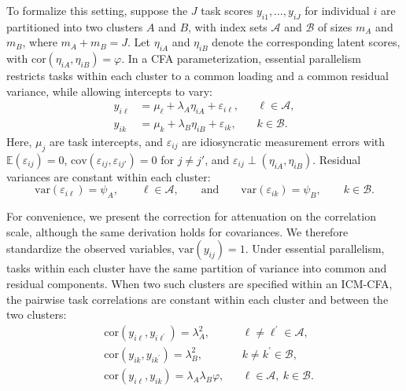 \documentclass[
  american,
  man,floatsintext]{apa7}
\begin{document}
To formalize this setting, suppose the \(J\) task scores \(y_{i1},\ldots,y_{iJ}\) for individual \(i\) are partitioned into two clusters \(A\) and \(B\), with index sets \(\mathcal A\) and \(\mathcal B\) of sizes \(m_A\) and \(m_B\), where \(m_A+m_B=J\). Let \(\eta_{iA}\) and \(\eta_{iB}\) denote the corresponding latent scores, with \(\mathrm{cor}(\eta_{iA},\eta_{iB})=\varphi\). In a CFA parameterization, essential parallelism restricts tasks within each cluster to a common loading and a common residual variance, while allowing intercepts to vary:
\[
\begin{aligned}
y_{i\ell} &= \mu_\ell+\lambda_A\eta_{iA}+\varepsilon_{i\ell},
&& \ell\in\mathcal A,\\
y_{ik} &= \mu_k+\lambda_B\eta_{iB}+\varepsilon_{ik},
&& k\in\mathcal B.
\end{aligned}
\]
Here, \(\mu_j\) are task intercepts, and \(\varepsilon_{ij}\) are idiosyncratic measurement errors with \(\mathbb E(\varepsilon_{ij})=0\), \(\mathrm{cov}(\varepsilon_{ij},\varepsilon_{ij'})=0\) for \(j\neq j'\), and \(\varepsilon_{ij}\perp(\eta_{iA},\eta_{iB})\). Residual variances are constant within each cluster:
\[
\mathrm{var}(\varepsilon_{i\ell})=\psi_A,\qquad \ell\in\mathcal A,
\qquad\text{and}\qquad
\mathrm{var}(\varepsilon_{ik})=\psi_B,\qquad k\in\mathcal B.
\]

For convenience, we present the correction for attenuation on the correlation scale, although the same derivation holds for covariances. We therefore standardize the observed variables, \(\mathrm{var}(y_{ij})=1\). Under essential parallelism, tasks within each cluster have the same partition of variance into common and residual components. When two such clusters are specified within an ICM-CFA, the pairwise task correlations are constant within each cluster and between the two clusters:
\[
\begin{aligned}
&\mathrm{cor}(y_{i\ell},y_{i\ell^{\prime}})=\lambda_A^2, && \ell\neq \ell^{\prime}\in \mathcal A,\\
&\mathrm{cor}(y_{ik},y_{ik^{\prime}})=\lambda_B^2, && k\neq k^{\prime}\in \mathcal B,\\
&\mathrm{cor}(y_{i\ell},y_{ik})=\lambda_A\lambda_B\varphi, && \ell\in \mathcal A,\ k\in \mathcal B.
\end{aligned}
\]
\end{document}
